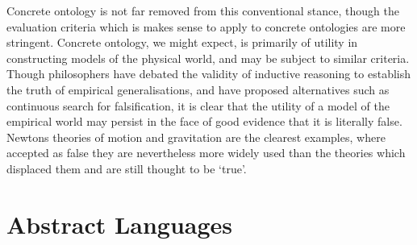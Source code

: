 Concrete ontology is not far removed from this conventional stance, though the evaluation criteria which is makes sense to apply to concrete ontologies are more stringent.
Concrete ontology, we might expect, is primarily of utility in constructing models of the physical world, and may be subject to similar criteria.
Though philosophers have debated the validity of inductive reasoning to establish the truth of empirical generalisations, and have proposed alternatives such as continuous search for falsification, it is clear that the utility of a model of the empirical world may persist in the face of good evidence that it is literally false.
Newtons theories of motion and gravitation are the clearest examples, where accepted as false they are nevertheless more widely used than the theories which displaced them and are still thought to be `true'.

\section{Abstract Languages}


